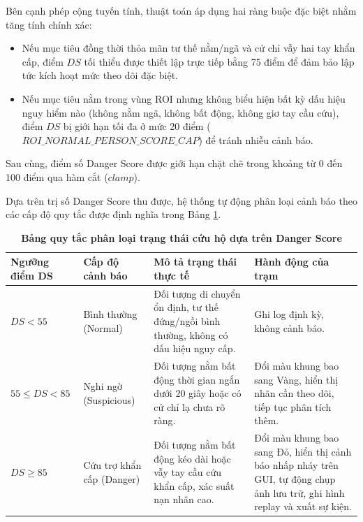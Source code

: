 Bên cạnh phép cộng tuyến tính, thuật toán áp dụng hai ràng buộc đặc biệt nhằm tăng tính chính xác:
\begin{itemize}
    \item Nếu mục tiêu đồng thời thỏa mãn tư thế nằm/ngã và cử chỉ vẫy hai tay khẩn cấp, điểm $DS$ tối thiểu được thiết lập trực tiếp bằng 75 điểm để đảm bảo lập tức kích hoạt mức theo dõi đặc biệt.
    \item Nếu mục tiêu nằm trong vùng ROI nhưng không biểu hiện bất kỳ dấu hiệu nguy hiểm nào (không nằm ngã, không bất động, không giơ tay cầu cứu), điểm $DS$ bị giới hạn tối đa ở mức 20 điểm ($ROI\_NORMAL\_PERSON\_SCORE\_CAP$) để tránh nhiễu cảnh báo.
\end{itemize}
Sau cùng, điểm số Danger Score được giới hạn chặt chẽ trong khoảng từ 0 đến 100 điểm qua hàm cắt ($clamp$).

Dựa trên trị số Danger Score thu được, hệ thống tự động phân loại cảnh báo theo các cấp độ quy tắc được định nghĩa trong Bảng \ref{tab:danger_rules}.

\begin{table}[H]
    \centering
    \caption[Bảng quy tắc phân loại trạng thái cứu hộ dựa trên Danger Score]{\bfseries\fontsize{12pt}{0pt}\selectfont Bảng quy tắc phân loại trạng thái cứu hộ dựa trên Danger Score}
    \begin{tabularx}{\textwidth}{|>{\centering\arraybackslash}m{2.2cm}|>{\centering\arraybackslash}m{2.5cm}|X|X|}
    \hline
    \rowcolor{LightCyan}
    \textbf{Ngưỡng điểm DS} & \textbf{Cấp độ cảnh báo} & \textbf{Mô tả trạng thái thực tế} & \textbf{Hành động của trạm} \\ \hline
    $DS < 55$ & Bình thường (Normal) & Đối tượng di chuyển ổn định, tư thế đứng/ngồi bình thường, không có dấu hiệu nguy cấp. & Ghi log định kỳ, không cảnh báo. \\ \hline
    $55 \le DS < 85$ & Nghi ngờ (Suspicious) & Đối tượng nằm bất động thời gian ngắn dưới 20 giây hoặc có cử chỉ lạ chưa rõ ràng. & Đổi màu khung bao sang Vàng, hiển thị nhãn cần theo dõi, tiếp tục phân tích thêm. \\ \hline
    $DS \ge 85$ & Cứu trợ khẩn cấp (Danger) & Đối tượng nằm bất động kéo dài hoặc vẫy tay cầu cứu khẩn cấp, xác suất nạn nhân cao. & Đổi màu khung bao sang Đỏ, hiển thị cảnh báo nhấp nháy trên GUI, tự động chụp ảnh lưu trữ, ghi hình replay và xuất sự kiện. \\ \hline
    \end{tabularx}
    \label{tab:danger_rules}
\end{table}

